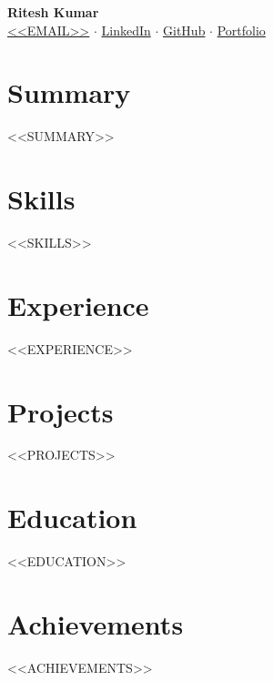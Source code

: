 \documentclass[10pt,a4paper]{article}
\begin{document}
\begin{center}
{\huge\bfseries Ritesh Kumar}\\[4pt]
\href{mailto:<<EMAIL>>}{<<EMAIL>>} $\cdot$
\href{<<LINKEDIN_URL>>}{LinkedIn} $\cdot$
\href{<<GITHUB_URL>>}{GitHub} $\cdot$
\href{<<PORTFOLIO_URL>>}{Portfolio}
\end{center}

\section*{Summary}
<<SUMMARY>>

\section*{Skills}
<<SKILLS>>

\section*{Experience}
<<EXPERIENCE>>

\section*{Projects}
<<PROJECTS>>

\section*{Education}
<<EDUCATION>>

\section*{Achievements}
<<ACHIEVEMENTS>>
\end{document}
